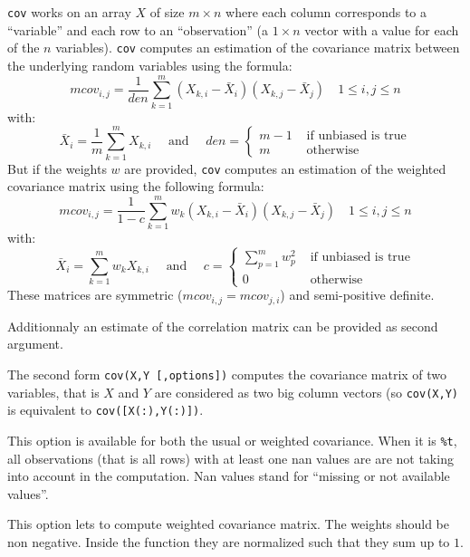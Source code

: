 \begin{mandescription}
  \verb+cov+ works on an array $X$ of size $m \times n$ where each column corresponds to
 a ``variable'' and each row to an ``observation'' (a $1 \times n$ vector with a value 
for each of the $n$ variables). \verb+cov+ computes an estimation of the covariance
matrix between the underlying random variables using the formula:
$$
    mcov_{i,j} = \frac{1}{den} \sum_{k=1}^m (X_{k,i} - \bar{X}_i) (X_{k,j} - \bar{X}_j) \quad 1 \le
   i,j \le n 
$$ 
with:
$$
   \bar{X}_i = \frac{1}{m} \sum_{k=1}^m X_{k,i}
   \quad \mbox{ and } \quad  den = \left\{ \begin{array}{cl}  m-1 & \mbox{ if unbiased is true}\\
                                                       m   & \mbox{ otherwise} \end{array}\right.
$$
But if the  weights $w$ are provided,  \verb+cov+ computes an estimation of the weighted covariance
matrix using the following formula:
$$
     mcov_{i,j} = \frac{1}{1 - c} \sum_{k=1}^m w_k (X_{k,i} - \bar{X}_i) (X_{k,j} - \bar{X}_j) \quad 1 \le
   i,j \le n  
$$
with:
$$
    \bar{X}_i =  \sum_{k=1}^m  w_k X_{k,i}
   \quad \mbox{ and } \quad  c = \left\{ \begin{array}{cl} \sum_{p=1}^m w_p^2  & \mbox{ if unbiased is true}\\
                                                       0   & \mbox{ otherwise} \end{array}\right.
$$
These matrices are symmetric ($mcov_{i,j} = mcov_{j,i}$) and semi-positive definite.

Additionnaly an estimate of the correlation matrix can be provided as second argument.

The second form  \verb+cov(X,Y [,options])+ computes the covariance matrix
of two variables, that is $X$ and $Y$ are considered as two big column vectors (so \verb+cov(X,Y)+
is equivalent to \verb+cov([X(:),Y(:)])+. 

   This option is available for both the usual or weighted covariance.
When it is \verb+%t+, all observations (that is all rows) with at least 
one nan values are are not taking into account in the computation.
Nan values stand for ``missing or not available values''.
   
  This option lets to compute weighted covariance matrix. The weights should be non negative. Inside
the function they are normalized such that they sum up to $1$.
   
\end{mandescription}

